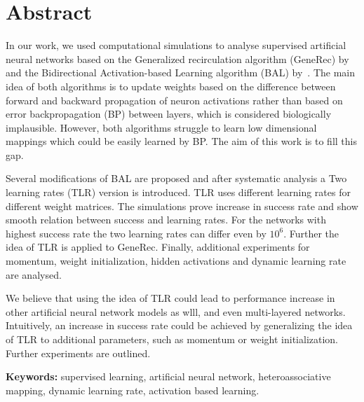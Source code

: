 
\section*{Abstract}

In our work, we used computational simulations to analyse supervised artificial neural networks based on the Generalized recirculation algorithm (GeneRec) by~\citet{o1996bio} and the Bidirectional Activation-based Learning algorithm (BAL) by~\citet{farkas2013bal}. The main idea of both algorithms is to update weights based on the difference between forward and backward propagation of neuron activations rather than based on error backpropagation (BP) between layers, which is considered biologically implausible. However, both algorithms struggle to learn low dimensional mappings which could be easily learned by BP. The aim of this work is to fill this gap. 

Several modifications of BAL are proposed and after systematic analysis a Two learning rates (TLR) version is introduced. TLR uses different learning rates for different weight matrices. The simulations prove increase in success rate and show smooth relation between success and learning rates. For the networks with highest success rate the two learning rates can differ even by $10^6$. Further the idea of TLR is applied to GeneRec. Finally, additional experiments for momentum, weight initialization, hidden activations and dynamic learning rate are analysed. 

We believe that using the idea of TLR could lead to performance increase in other artificial neural network models as wlll, and even multi-layered networks. Intuitively, an increase in success rate could be achieved by generalizing the idea of TLR to additional parameters, such as momentum or weight initialization. Further experiments are outlined. 

\begin{flushleft}
  \textbf{Keywords:} supervised learning, artificial neural network, heteroassociative mapping, dynamic learning rate, activation based learning. 
\end{flushleft}


